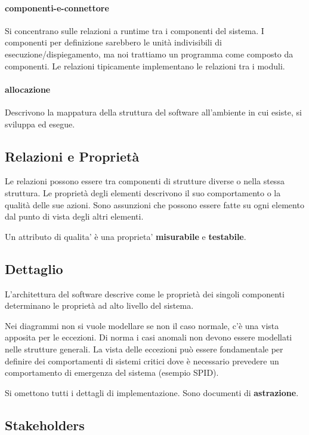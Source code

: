 \paragraph{componenti-e-connettore}

Si concentrano sulle relazioni a runtime tra i componenti del sistema.
I componenti per definizione sarebbero le unit\`a indivisibili di esecuzione/dispiegamento, ma noi trattiamo un programma come composto da componenti.
Le relazioni tipicamente implementano le relazioni tra i moduli.

\paragraph{allocazione}

Descrivono la mappatura della struttura del software all'ambiente in cui esiste, si sviluppa ed esegue.

\subsection{Relazioni e Propriet\`a}

Le relazioni possono essere tra componenti di strutture diverse o nella stessa struttura.
Le propriet\`a degli elementi descrivono il suo comportamento o la qualit\`a delle sue azioni.
Sono assunzioni che possono essere fatte su ogni elemento dal punto di vista degli altri elementi.

Un attributo di qualita' \`e una proprieta' \textbf{misurabile} e \textbf{testabile}.

\subsection{Dettaglio}

L'architettura del software descrive come le propriet\`a dei singoli componenti determinano le propriet\`a ad alto livello del sistema.

Nei diagrammi non si vuole modellare se non il caso normale, c'\`e una vista apposita per le eccezioni. Di norma i casi anomali non devono essere modellati nelle strutture generali. La vista delle eccezioni pu\`o essere fondamentale per definire dei comportamenti di sistemi critici dove \`e necessario prevedere un comportamento di emergenza del sistema (esempio SPID).

Si omettono tutti i dettagli di implementazione. Sono documenti di \textbf{astrazione}.

\subsection{Stakeholders}

